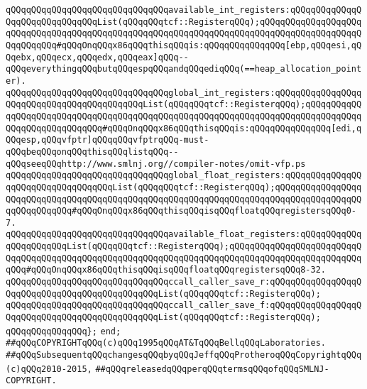 \newline
\verb|qQQqqQQqqQQqqQQqqQQqqQQqqQQqqQQqavailable_int_registers:qQQqqQQqqQQqqQQqqQQqqQQqqQQqqQQqList(qQQqqQQqtcf::RegisterqQQq);qQQqqQQqqQQqqQQqqQQqqQQqqQQqqQQqqQQqqQQqqQQqqQQqqQQqqQQqqQQqqQQqqQQqqQQqqQQqqQQqqQQqqQQqqQQqqQQqqQQq#qQQqOnqQQqx86qQQqthisqQQqis:qQQqqQQqqQQqqQQq[ebp,qQQqesi,qQQqebx,qQQqecx,qQQqedx,qQQqeax]qQQq--qQQqeverythingqQQqbutqQQqespqQQqandqQQqediqQQq(==heap_allocation_pointer).|\newline
\verb|qQQqqQQqqQQqqQQqqQQqqQQqqQQqqQQqglobal_int_registers:qQQqqQQqqQQqqQQqqQQqqQQqqQQqqQQqqQQqqQQqqQQqList(qQQqqQQqtcf::RegisterqQQq);qQQqqQQqqQQqqQQqqQQqqQQqqQQqqQQqqQQqqQQqqQQqqQQqqQQqqQQqqQQqqQQqqQQqqQQqqQQqqQQqqQQqqQQqqQQqqQQqqQQq#qQQqOnqQQqx86qQQqthisqQQqis:qQQqqQQqqQQqqQQq[edi,qQQqesp,qQQqvfptr]qQQqqQQqvfptrqQQq-must-qQQqbeqQQqonqQQqthisqQQqlistqQQq--qQQqseeqQQqhttp://www.smlnj.org//compiler-notes/omit-vfp.ps|\newline
\newline
\verb|qQQqqQQqqQQqqQQqqQQqqQQqqQQqqQQqglobal_float_registers:qQQqqQQqqQQqqQQqqQQqqQQqqQQqqQQqqQQqList(qQQqqQQqtcf::RegisterqQQq);qQQqqQQqqQQqqQQqqQQqqQQqqQQqqQQqqQQqqQQqqQQqqQQqqQQqqQQqqQQqqQQqqQQqqQQqqQQqqQQqqQQqqQQqqQQqqQQqqQQq#qQQqOnqQQqx86qQQqthisqQQqisqQQqfloatqQQqregistersqQQq0-7.|\newline
\verb|qQQqqQQqqQQqqQQqqQQqqQQqqQQqqQQqavailable_float_registers:qQQqqQQqqQQqqQQqqQQqqQQqList(qQQqqQQqtcf::RegisterqQQq);qQQqqQQqqQQqqQQqqQQqqQQqqQQqqQQqqQQqqQQqqQQqqQQqqQQqqQQqqQQqqQQqqQQqqQQqqQQqqQQqqQQqqQQqqQQqqQQqqQQq#qQQqOnqQQqx86qQQqthisqQQqisqQQqfloatqQQqregistersqQQq8-32.|\newline
\newline
\verb|qQQqqQQqqQQqqQQqqQQqqQQqqQQqqQQqccall_caller_save_r:qQQqqQQqqQQqqQQqqQQqqQQqqQQqqQQqqQQqqQQqqQQqqQQqList(qQQqqQQqtcf::RegisterqQQq);|\newline
\verb|qQQqqQQqqQQqqQQqqQQqqQQqqQQqqQQqccall_caller_save_f:qQQqqQQqqQQqqQQqqQQqqQQqqQQqqQQqqQQqqQQqqQQqqQQqList(qQQqqQQqtcf::RegisterqQQq);|\newline
\verb|qQQqqQQqqQQqqQQq};|\newline
\verb|end;|\newline
\newline
\verb|##qQQqCOPYRIGHTqQQq(c)qQQq1995qQQqAT&TqQQqBellqQQqLaboratories.|\newline
\verb|##qQQqSubsequentqQQqchangesqQQqbyqQQqJeffqQQqProtheroqQQqCopyrightqQQq(c)qQQq2010-2015,|\newline
\verb|##qQQqreleasedqQQqperqQQqtermsqQQqofqQQqSMLNJ-COPYRIGHT.|\newline

